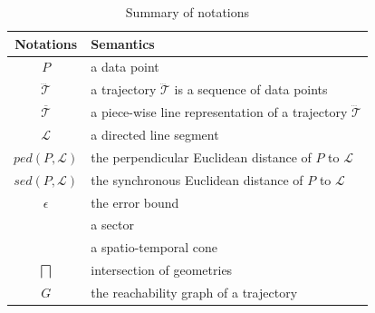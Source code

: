 \begin{table}
	\renewcommand{\arraystretch}{1.20}
	\vspace{-1ex}
	\caption{\small Summary of notations}
	\centering
	\small
	\begin{tabular}{|c|l|}
		\hline
		{\bf Notations}& {\bf Semantics}   \\		\hline %
		$P$ & a data point \\		\hline
		$\dddot{\mathcal{T}}$ & a trajectory $\dddot{\mathcal{T}}$ is a sequence of data points\\		\hline
		$\overline{\mathcal{T}}$&  {a piece-wise line representation of a trajectory $\dddot{\mathcal{T}}$}	\\		\hline
		$\mathcal{L}$ & a directed line segment  \\		\hline
		$ped(P, \mathcal{L})$ &  {the perpendicular Euclidean distance of $P$ to $\mathcal{L}$}	\\	\hline
		$sed(P, \mathcal{L})$ & {the synchronous Euclidean distance of $P$ to $\mathcal{L}$} 	\\		\hline
		$\epsilon$ & the error bound \\		\hline
		\sector{} & a sector \\		\hline
		\cone{} & a spatio-temporal cone \\		\hline
		$\bigsqcap$ & intersection of geometries\\		\hline
		$G$ &	the reachability graph of a trajectory\\		\hline
	\end{tabular}
	\label{tab:notations}
	\vspace{-1ex}
\end{table}


